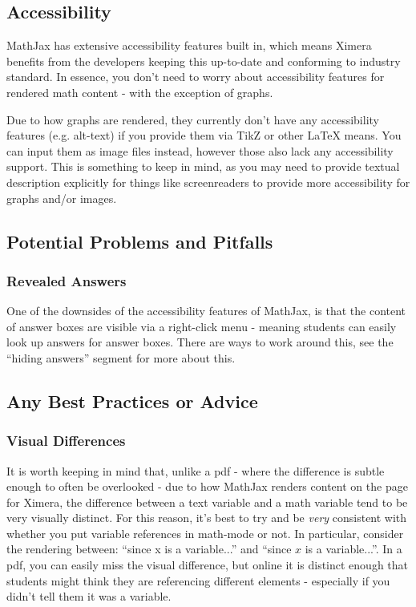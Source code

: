 \documentclass{ximera}
\begin{document}
    
    \subsection*{Accessibility}
        MathJax has extensive accessibility features built in, which means Ximera benefits from the developers keeping this up-to-date and conforming to industry standard. In essence, you don't need to worry about accessibility features for rendered math content - with the exception of graphs.
        
        Due to how graphs are rendered, they currently don't have any accessibility features (e.g. alt-text) if you provide them via TikZ or other LaTeX means. You can input them as image files instead, however those also lack any accessibility support. This is something to keep in mind, as you may need to provide textual description explicitly for things like screenreaders to provide more accessibility for graphs and/or images.
    
    
    \subsection*{Potential Problems and Pitfalls}
        \subsubsection*{Revealed Answers}
            One of the downsides of the accessibility features of MathJax, is that the content of answer boxes are visible via a right-click menu - meaning students can easily look up answers for answer boxes. There are ways to work around this, see the ``hiding answers'' segment for more about this.
    
    
    \subsection*{Any Best Practices or Advice}
        
        \subsubsection*{Visual Differences}
            It is worth keeping in mind that, unlike a pdf - where the difference is subtle enough to often be overlooked - due to how MathJax renders content on the page for Ximera, the difference between a text variable and a math variable tend to be very visually distinct. For this reason, it's best to try and be \textit{very} consistent with whether you put variable references in math-mode or not. In particular, consider the rendering between: ``since x is a variable...'' and ``since $x$ is a variable...''. In a pdf, you can easily miss the visual difference, but online it is distinct enough that students might think they are referencing different elements - especially if you didn't tell them it was a variable. 
        
\end{document}
